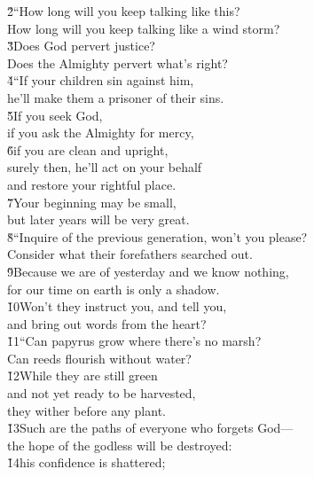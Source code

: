 \begin{poetry}
\poeml \v{2}``How long will you keep talking like this? \\
\poemll    How long will you keep talking like a wind storm? \\
\poeml \v{3}Does God pervert justice? \\
\poemll    Does the Almighty pervert what's right? \\
\poeml \v{4}``If your children sin against him, \\
\poemll    he'll make them a prisoner of their sins. \\
\poeml \v{5}If you seek God, \\
\poemll    if you ask the Almighty for mercy, \\
\poeml \v{6}if you are clean and upright, \\
\poemll    surely then, he'll act on your behalf \\
\poemlll       and restore your rightful place. \\
\poeml \v{7}Your beginning may be small, \\
\poemll    but later years will be very great. \\
\poeml \v{8}``Inquire of the previous generation, won't you please? \\
\poemll    Consider what their forefathers searched out. \\
\poeml \v{9}Because we are of yesterday and we know nothing, \\
\poemll    for our time on earth is only a shadow. \\
\poeml \v{10}Won't they instruct you, and tell you, \\
\poemll    and bring out words from the heart? \\
\poeml \v{11}``Can papyrus grow where there's no marsh? \\
\poemll    Can reeds flourish without water? \\
\poeml \v{12}While they are still green \\
\poemll    and not yet ready to be harvested, \\
\poemlll       they wither before any plant. \\
\poeml \v{13}Such are the paths of everyone who forgets God--- \\
\poemll    the hope of the godless will be destroyed: \\
\poeml \v{14}his confidence is shattered; \\

\end{poetry}
